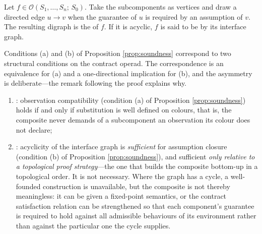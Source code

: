 \begin{definition}\label{def:interface-graph}
Let $f \in \mathcal{O}(S_1,\dots,S_n;\,S_0)$. Take the subcomponents as vertices and draw a
directed edge $u \to v$ when the guarantee of $u$ is required by an assumption of $v$. The
resulting digraph is the  of $f$. If it is acyclic, $f$ is said to be
 by its interface graph.
\end{definition}

\begin{proposition}\label{prop:operad-compose}
Conditions (a) and (b) of Proposition \ref{prop:soundness} correspond to two structural
conditions on the contract operad. The correspondence is an equivalence for (a) and a
one-directional implication for (b), and the asymmetry is deliberate---the remark following the
proof explains why.
\begin{enumerate}[label=(\alph*)]
\item {}: observation compatibility (condition (a) of
      Proposition \ref{prop:soundness}) holds if and only if substitution is well defined
      on colours, that is, the composite never demands of a subcomponent an observation its
      colour does not declare;
\item {}: acyclicity of the interface graph is \emph{sufficient} for
      assumption closure (condition (b) of Proposition \ref{prop:soundness}), and sufficient
      \emph{only relative to a topological proof strategy}---the one that builds the composite
      bottom-up in a topological order. It is not necessary. Where the graph has a cycle, a
      well-founded construction is unavailable, but the composite is not thereby meaningless: it
      can be given a fixed-point semantics, or the contract satisfaction relation can be
      strengthened so that each component's guarantee is required to hold against all admissible
      behaviours of its environment rather than against the particular one the cycle supplies.
\end{enumerate}
\end{proposition}

